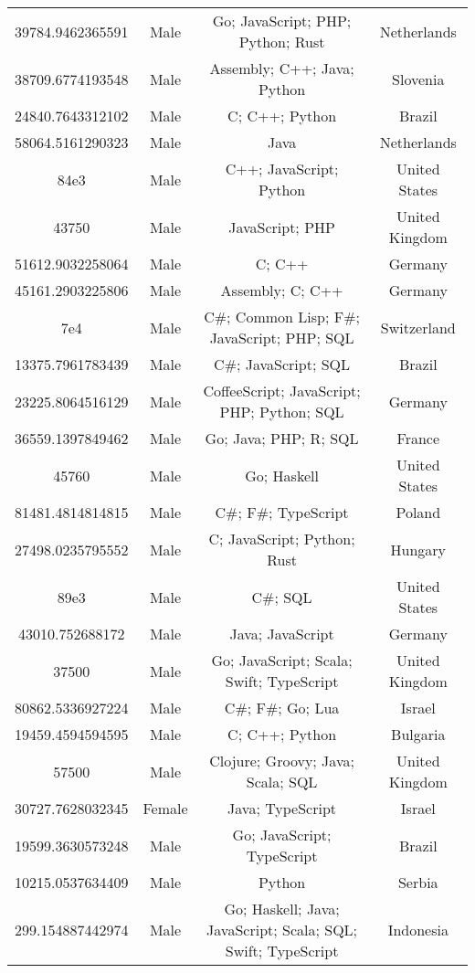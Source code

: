 \begin{center}
\begin{tabular}{ |c|c|c|c| }
39784.9462365591  &  Male  &  Go; JavaScript; PHP; Python; Rust  &  Netherlands  \\ 
38709.6774193548  &  Male  &  Assembly; C++; Java; Python  &  Slovenia  \\ 
24840.7643312102  &  Male  &  C; C++; Python  &  Brazil  \\ 
58064.5161290323  &  Male  &  Java  &  Netherlands  \\ 
84e3  &  Male  &  C++; JavaScript; Python  &  United States  \\ 
43750  &  Male  &  JavaScript; PHP  &  United Kingdom  \\ 
51612.9032258064  &  Male  &  C; C++  &  Germany  \\ 
45161.2903225806  &  Male  &  Assembly; C; C++  &  Germany  \\ 
7e4  &  Male  &  C\#; Common Lisp; F\#; JavaScript; PHP; SQL  &  Switzerland  \\ 
13375.7961783439  &  Male  &  C\#; JavaScript; SQL  &  Brazil  \\ 
23225.8064516129  &  Male  &  CoffeeScript; JavaScript; PHP; Python; SQL  &  Germany  \\ 
36559.1397849462  &  Male  &  Go; Java; PHP; R; SQL  &  France  \\ 
45760  &  Male  &  Go; Haskell  &  United States  \\ 
81481.4814814815  &  Male  &  C\#; F\#; TypeScript  &  Poland  \\ 
27498.0235795552  &  Male  &  C; JavaScript; Python; Rust  &  Hungary  \\ 
89e3  &  Male  &  C\#; SQL  &  United States  \\ 
43010.752688172  &  Male  &  Java; JavaScript  &  Germany  \\ 
37500  &  Male  &  Go; JavaScript; Scala; Swift; TypeScript  &  United Kingdom  \\ 
80862.5336927224  &  Male  &  C\#; F\#; Go; Lua  &  Israel  \\ 
19459.4594594595  &  Male  &  C; C++; Python  &  Bulgaria  \\ 
57500  &  Male  &  Clojure; Groovy; Java; Scala; SQL  &  United Kingdom  \\ 
30727.7628032345  &  Female  &  Java; TypeScript  &  Israel  \\ 
19599.3630573248  &  Male  &  Go; JavaScript; TypeScript  &  Brazil  \\ 
10215.0537634409  &  Male  &  Python  &  Serbia  \\ 
299.154887442974  &  Male  &  Go; Haskell; Java; JavaScript; Scala; SQL; Swift; TypeScript  &  Indonesia  \\ 

\end{tabular}
\end{center}
